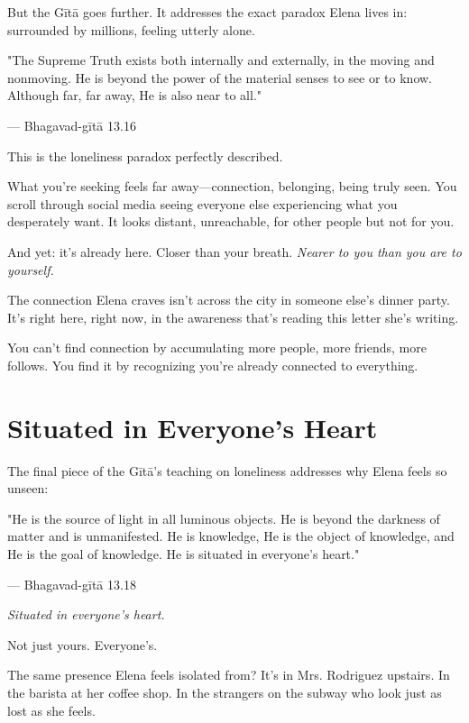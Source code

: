 \documentclass[11pt,twoside]{book}
\begin{document}
But the Gītā goes further. It addresses the exact paradox Elena lives in: surrounded by millions, feeling utterly alone.

\begin{pullquote}
"The Supreme Truth exists both internally and externally, in the moving and nonmoving. He is beyond the power of the material senses to see or to know. Although far, far away, He is also near to all."

--- Bhagavad-gītā 13.16
\end{pullquote}

This is the loneliness paradox perfectly described.

What you're seeking feels far away—connection, belonging, being truly seen. You scroll through social media seeing everyone else experiencing what you desperately want. It looks distant, unreachable, for other people but not for you.

And yet: it's already here. Closer than your breath. \textit{Nearer to you than you are to yourself.}

The connection Elena craves isn't across the city in someone else's dinner party. It's right here, right now, in the awareness that's reading this letter she's writing.

You can't find connection by accumulating more people, more friends, more follows. You find it by recognizing you're already connected to everything.

\section*{Situated in Everyone's Heart}

The final piece of the Gītā's teaching on loneliness addresses why Elena feels so unseen:

\begin{pullquote}
"He is the source of light in all luminous objects. He is beyond the darkness of matter and is unmanifested. He is knowledge, He is the object of knowledge, and He is the goal of knowledge. He is situated in everyone's heart."

--- Bhagavad-gītā 13.18
\end{pullquote}

\textit{Situated in everyone's heart.}

Not just yours. Everyone's.

The same presence Elena feels isolated from? It's in Mrs. Rodriguez upstairs. In the barista at her coffee shop. In the strangers on the subway who look just as lost as she feels.
\end{document}
